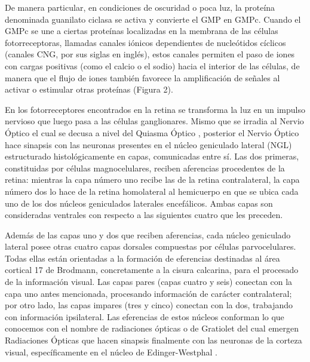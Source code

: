 \documentclass[10pt]{article}
\begin{document}
\setlength{\parskip}{2mm}

De manera particular, en condiciones de oscuridad o poca luz, la proteína denominada guanilato ciclasa se activa y convierte el GMP en GMPc. Cuando el GMPc se une a ciertas proteínas localizadas en la membrana de las células fotorreceptoras, llamadas canales iónicos dependientes de nucleótidos cíclicos (canales CNG, por sus siglas en inglés), estos canales permiten el paso de iones con cargas positivas (como el calcio o el sodio) hacia el interior de las células, de manera que el flujo de iones también favorece la amplificación de señales al activar o estimular otras proteínas \cite{IEEEreferencias:Ref12} (Figura 2).

\setlength{\parskip}{2mm}

En los fotorreceptores encontrados en la retina se transforma la luz en un impulso nervioso que luego pasa a las células ganglionares.  Mismo que se irradia al Nervio Óptico el cual se decusa a nivel del Quiasma Óptico \cite{IEEEreferencias:Ref14}, posterior el Nervio Óptico hace sinapsis con las neuronas presentes en el núcleo geniculado lateral (NGL) estructurado histológicamente en capas, comunicadas entre sí. Las dos primeras, constituidas por células magnocelulares, reciben aferencias procedentes de la retina: mientras la capa número uno recibe las de la retina contralateral, la capa número dos lo hace de la retina homolateral al hemicuerpo en que se ubica cada uno de los dos núcleos geniculados laterales encefálicos. Ambas capas son consideradas ventrales con respecto a las siguientes cuatro que les preceden\cite{IEEEreferencias:Ref15}.

\setlength{\parskip}{2mm}

Además de las capas uno y dos que reciben aferencias, cada núcleo geniculado lateral posee otras cuatro capas dorsales compuestas por células parvocelulares. Todas ellas están orientadas a la formación de eferencias destinadas al área cortical 17 de Brodmann, concretamente a la cisura calcarina, para el procesado de la información visual. Las capas pares (capas cuatro y seis) conectan con la capa uno antes mencionada, procesando información de carácter contralateral; por otro lado, las capas impares (tres y cinco) conectan con la dos, trabajando con información ipsilateral. Las eferencias de estos núcleos conforman lo que conocemos con el nombre de radiaciones ópticas o de Gratiolet\cite{IEEEreferencias:Ref15} del cual emergen Radiaciones Ópticas que hacen sinapsis finalmente con las neuronas de la corteza visual, específicamente en el núcleo de Edinger-Westphal \cite{IEEEreferencias:Ref14}.
\end{document}
